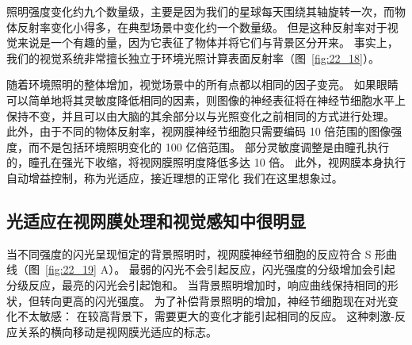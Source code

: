 照明强度变化约九个数量级，主要是因为我们的星球每天围绕其轴旋转一次，而物体反射率变化小得多，在典型场景中变化约一个数量级。
但是这种反射率对于视觉来说是一个有趣的量，因为它表征了物体并将它们与背景区分开来。
事实上，我们的视觉系统非常擅长独立于环境光照计算表面反射率（图~\ref{fig:22_18}）。


随着环境照明的整体增加，视觉场景中的所有点都以相同的因子变亮。
如果眼睛可以简单地将其灵敏度降低相同的因素，则图像的神经表征将在神经节细胞水平上保持不变，并且可以由大脑的其余部分以与光照变化之前相同的方式进行处理。 
此外，由于不同的物体反射率，视网膜神经节细胞只需要编码 10 倍范围的图像强度，而不是包括环境照明变化的 100 亿倍范围。
部分灵敏度调整是由瞳孔执行的，瞳孔在强光下收缩，将视网膜照明度降低多达 10 倍。
此外，视网膜本身执行自动增益控制，称为光适应，接近理想的正常化 我们在这里想象过。



\subsection{光适应在视网膜处理和视觉感知中很明显}

当不同强度的闪光呈现恒定的背景照明时，视网膜神经节细胞的反应符合 S 形曲线（图~\ref{fig:22_19} A）。
最弱的闪光不会引起反应，闪光强度的分级增加会引起分级反应，最亮的闪光会引起饱和。
当背景照明增加时，响应曲线保持相同的形状，但转向更高的闪光强度。
为了补偿背景照明的增加，神经节细胞现在对光变化不太敏感：
在较高背景下，需要更大的变化才能引起相同的反应。
这种刺激-反应关系的横向移动是视网膜光适应的标志。


